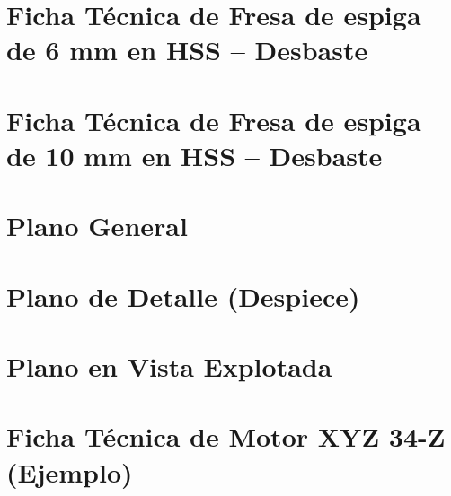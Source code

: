 \section{Ficha Técnica de Fresa de espiga de 6 mm en HSS -- Desbaste}

\section{Ficha Técnica de Fresa de espiga de 10 mm en HSS -- Desbaste}

\section{Plano General}

\section{Plano de Detalle (Despiece)}

\section{Plano en Vista Explotada}

\section{Ficha Técnica de Motor XYZ 34-Z (Ejemplo)}